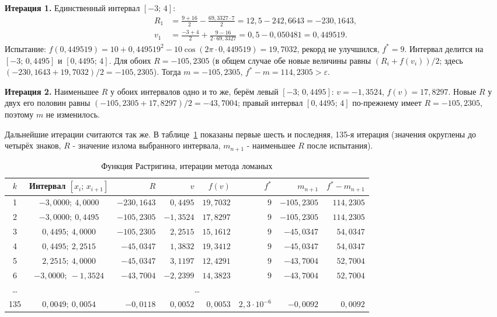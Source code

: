 \documentclass[a4paper,12pt]{article}
\begin{document}
\textbf{Итерация 1.} Единственный интервал $[-3;\,4]$:
\begin{align*}
R_1 &= \frac{9 + 16}{2} - \frac{69{,}3327 \cdot 7}{2} = 12{,}5 - 242{,}6643 = -230{,}1643,\\
v_1 &= \frac{-3 + 4}{2} + \frac{9 - 16}{2 \cdot 69{,}3327} = 0{,}5 - 0{,}050481 = 0{,}449519.
\end{align*}
Испытание: $f(0{,}449519) = 10 + 0{,}449519^2 - 10\cos(2\pi \cdot 0{,}449519) = 19{,}7032$, рекорд не улучшился, $f^* = 9$. Интервал делится на $[-3;\,0{,}4495]$ и $[0{,}4495;\,4]$. Для обоих $R = -105{,}2305$ (в общем случае обе новые величины равны $(R_i + f(v_i))/2$; здесь $(-230{,}1643 + 19{,}7032)/2 = -105{,}2305$). Тогда $m = -105{,}2305$, $f^* - m = 114{,}2305 > \varepsilon$.

\textbf{Итерация 2.} Наименьшее $R$ у обоих интервалов одно и то же, берём левый $[-3;\,0{,}4495]$: $v = -1{,}3524$, $f(v) = 17{,}8297$. Новые $R$ у двух его половин равны $(-105{,}2305 + 17{,}8297)/2 = -43{,}7004$; правый интервал $[0{,}4495;\,4]$ по-прежнему имеет $R = -105{,}2305$, поэтому $m$ не изменилось.

Дальнейшие итерации считаются так же. В таблице~\ref{tab:trace} показаны первые шесть и последняя, 135-я итерация (значения округлены до четырёх знаков, $R$ - значение излома выбранного интервала, $m_{n+1}$ - наименьшее $R$ после испытания).

\begin{table}[H]
\centering\small
\caption{Функция Растригина, итерации метода ломаных}
\label{tab:trace}
\begin{tabular}{|c|c|r|r|r|r|r|r|}
\hline
$k$ & Интервал $[x_i;\,x_{i+1}]$ & $R$ & $v$ & $f(v)$ & $f^*$ & $m_{n+1}$ & $f^* - m_{n+1}$ \\ \hline
1 & $-3{,}0000;\ 4{,}0000$ & $-230{,}1643$ & $0{,}4495$ & $19{,}7032$ & $9$ & $-105{,}2305$ & $114{,}2305$ \\
2 & $-3{,}0000;\ 0{,}4495$ & $-105{,}2305$ & $-1{,}3524$ & $17{,}8297$ & $9$ & $-105{,}2305$ & $114{,}2305$ \\
3 & $0{,}4495;\ 4{,}0000$ & $-105{,}2305$ & $2{,}2515$ & $15{,}1612$ & $9$ & $-45{,}0347$ & $54{,}0347$ \\
4 & $0{,}4495;\ 2{,}2515$ & $-45{,}0347$ & $1{,}3832$ & $19{,}3412$ & $9$ & $-45{,}0347$ & $54{,}0347$ \\
5 & $2{,}2515;\ 4{,}0000$ & $-45{,}0347$ & $3{,}1197$ & $12{,}4291$ & $9$ & $-43{,}7004$ & $52{,}7004$ \\
6 & $-3{,}0000;\ -1{,}3524$ & $-43{,}7004$ & $-2{,}2399$ & $14{,}3823$ & $9$ & $-43{,}7004$ & $52{,}7004$ \\
\dots & \multicolumn{7}{c|}{\dots} \\
135 & $0{,}0049;\ 0{,}0054$ & $-0{,}0118$ & $0{,}0052$ & $0{,}0053$ & $2{,}3 \cdot 10^{-6}$ & $-0{,}0092$ & $0{,}0092$ \\
\hline
\end{tabular}
\end{table}
\end{document}
